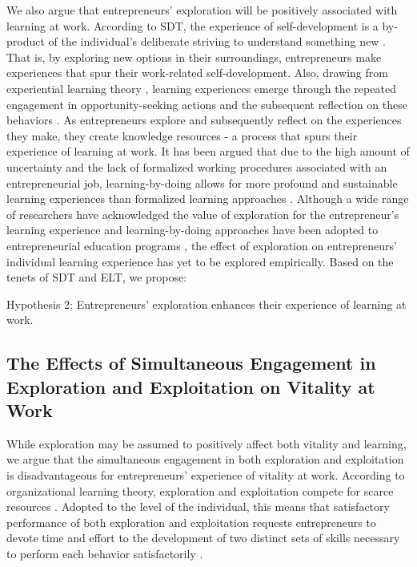 \documentclass[man, 12pt, a4paper, noextraspace]{apa6}
\begin{document}
We also argue that entrepreneurs' exploration will be positively associated with learning at work.
According to SDT, the experience of self-development is a by-product of the individual's deliberate striving to understand something new \parencite{Spreitzer.2005b}. 
That is, by exploring new options in their surroundings, entrepreneurs make experiences that spur their work-related self-development.  
Also, drawing from experiential learning theory \parencite[ELT;][]{Kolb2009}, learning experiences emerge through the repeated engagement in opportunity-seeking actions and the subsequent reflection on these behaviors \parencite{Holcomb2009}. 
As entrepreneurs explore and subsequently reflect on the experiences they make, they create knowledge resources - a process that spurs their experience of learning at work. 
It has been argued that due to the high amount of uncertainty and the lack of formalized working procedures associated with an entrepreneurial job, learning-by-doing allows for more profound and sustainable learning experiences than formalized learning approaches \parencite[e.g.,][]{Minniti.2001, Cope.2000, Chang2014}. 
Although a wide range of researchers have acknowledged the value of exploration for the entrepreneur's learning experience and learning-by-doing approaches have been adopted to entrepreneurial education programs \parencite[e.g.,][]{Chang2014, Pittaway2011, Daly2001}, the effect of exploration on entrepreneurs' individual learning experience has yet to be explored empirically. 
Based on the tenets of SDT and ELT, we propose: \par 

Hypothesis 2: Entrepreneurs' exploration enhances their experience of learning at work. \par 

\subsection{The Effects of Simultaneous Engagement in Exploration and Exploitation on Vitality at Work}

While exploration may be assumed to positively affect both vitality and learning, we argue that the simultaneous engagement in both exploration and exploitation is disadvantageous for entrepreneurs' experience of vitality at work. 
According to organizational learning theory, exploration and exploitation compete for scarce resources \parencite{March.1991}.
Adopted to the level of the individual, this means that satisfactory performance of both exploration and exploitation requests entrepreneurs to devote time and effort to the development of two distinct sets of skills necessary to perform each behavior satisfactorily \parencite{Papachroni2020}. \par 
\end{document}

